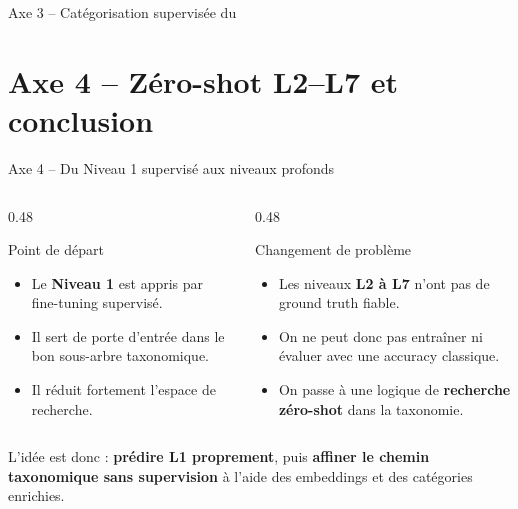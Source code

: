 \documentclass[11pt,aspectratio=169]{beamer}
\begin{document}
\begin{frame}{Axe 3 -- Catégorisation supervisée du} 
\end{frame}

\section{Axe 4 -- Zéro-shot L2--L7 et conclusion}

\begin{frame}{Axe 4 -- Du Niveau 1 supervisé aux niveaux profonds}
\small
\begin{columns}
\begin{column}{0.48\textwidth}
\begin{block}{Point de départ}
\begin{itemize}
    \item Le \textbf{Niveau 1} est appris par fine-tuning supervisé.
    \item Il sert de porte d'entrée dans le bon sous-arbre taxonomique.
    \item Il réduit fortement l'espace de recherche.
\end{itemize}
\end{block}
\end{column}

\begin{column}{0.48\textwidth}
\begin{block}{Changement de problème}
\begin{itemize}
    \item Les niveaux \textbf{L2 à L7} n'ont pas de ground truth fiable.
    \item On ne peut donc pas entraîner ni évaluer avec une accuracy classique.
    \item On passe à une logique de \textbf{recherche zéro-shot} dans la taxonomie.
\end{itemize}
\end{block}
\end{column}
\end{columns}

\vspace{0.3cm}

\begin{takeawaybox}
\centering
L'idée est donc : \textbf{prédire L1 proprement}, puis \textbf{affiner le chemin taxonomique sans supervision} à l'aide des embeddings et des catégories enrichies.
\end{takeawaybox}
\end{frame}
\end{document}
